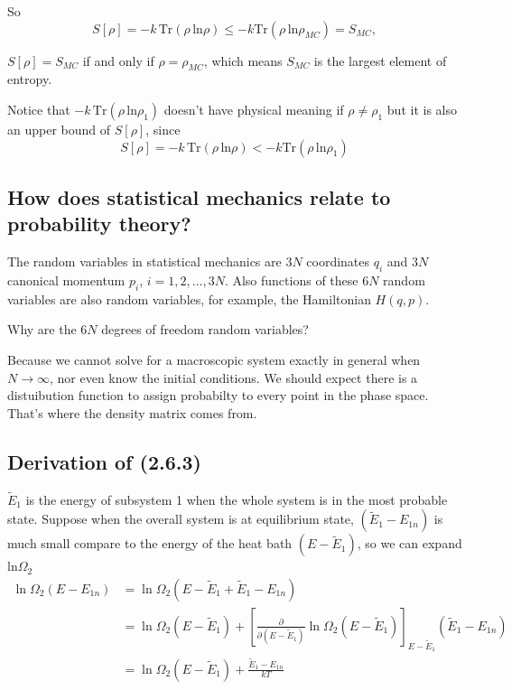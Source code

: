 \documentclass[10pt]{article}
\begin{document}
So
\begin{equation}
	S[\rho] = -k \, \mathrm{Tr}(\rho \, \mathrm{ln}\rho) \le -k \mathrm{Tr}(\rho \, \mathrm{ln}\rho_{MC}) = S_{MC},
\end{equation}

$S[\rho] = S_{MC}$ if and only if $\rho = \rho_{MC}$, which means $S_{MC}$ is the largest element of entropy.

Notice that $-k \, \mathrm{Tr}(\rho \, \mathrm{ln}\rho_1)$ doesn't have physical meaning if $\rho \neq \rho_1$ but it is also an upper bound of $S[\rho]$, since
\begin{equation}
	S[\rho] = -k \, \mathrm{Tr}(\rho \, \mathrm{ln}\rho) < -k \mathrm{Tr}(\rho \, \mathrm{ln}\rho_1)
\end{equation}

\subsection{How does statistical mechanics relate to probability theory?}

The random variables in statistical mechanics are 3$N$ coordinates $q_i$ and 3$N$ canonical momentum $p_i$, $i = 1,2, \dots, 3N$. Also functions of these 6$N$ random variables are also random variables, for example, the Hamiltonian $H(q,p)$.

Why are the 6$N$ degrees of freedom random variables?

Because we cannot solve for a macroscopic system exactly in general when $N \to \infty$, nor even know the initial conditions. We should expect there is a distuibution function to assign probabilty to every point in the phase space. That's where the density matrix comes from.

\subsection{Derivation of (2.6.3)}


$\tilde{E}_1$ is the energy of subsystem 1 when the whole system is in the most probable state. Suppose when the overall system is at equilibrium state, $(\tilde{E}_1 - E_{1n})$ is much small compare to the energy of the heat bath $(E - \tilde{E}_1)$, so we can expand $\mathrm{ln}\Omega_2 $
\begin{align*}
	\ln\Omega_2(E - E_{1n}) &= \ln\Omega_2(E - \tilde{E}_1 + \tilde{E}_1 - E_{1n}) \\
	&= \ln\Omega_2(E - \tilde{E}_1) + \left[\frac{\partial }{\partial(E - \tilde{E}_1)}\ln\Omega_2(E - \tilde{E}_1)\right]_{E - \tilde{E}_1}(\tilde{E}_1 - E_{1n}) \\
	&= \ln\Omega_2(E - \tilde{E}_1) + \frac{\tilde{E}_1 - E_{1n}}{kT}
\end{align*}
\end{document}
